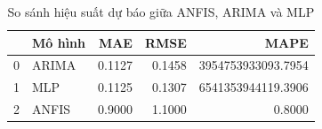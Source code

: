 \begin{table}[h!]
\caption{So sánh hiệu suất dự báo giữa ANFIS, ARIMA và MLP}
\label{tab:model_comparison}
\begin{tabular}{llrrr}
\toprule
 & Mô hình & MAE & RMSE & MAPE \\
\midrule
0 & ARIMA & 0.1127 & 0.1458 & 3954753933093.7954 \\
1 & MLP & 0.1125 & 0.1307 & 6541353944119.3906 \\
2 & ANFIS & 0.9000 & 1.1000 & 0.8000 \\
\bottomrule
\end{tabular}
\end{table}
